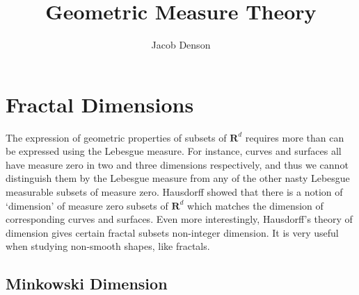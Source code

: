

\title{Geometric Measure Theory}
\author{Jacob Denson}




\maketitle

\tableofcontents


\chapter{Fractal Dimensions}

The expression of geometric properties of subsets of $\mathbf{R}^d$ requires more than can be expressed using the Lebesgue measure. For instance, curves and surfaces all have measure zero in two and three dimensions respectively, and thus we cannot distinguish them by the Lebesgue measure from any of the other nasty Lebesgue measurable subsets of measure zero. Hausdorff showed that there is a notion of `dimension' of measure zero subsets of $\mathbf{R}^d$ which matches the dimension of corresponding curves and surfaces. Even more interestingly, Hausdorff's theory of dimension gives certain fractal subsets non-integer dimension. It is very useful when studying non-smooth shapes, like fractals.


\section{Minkowski Dimension}


